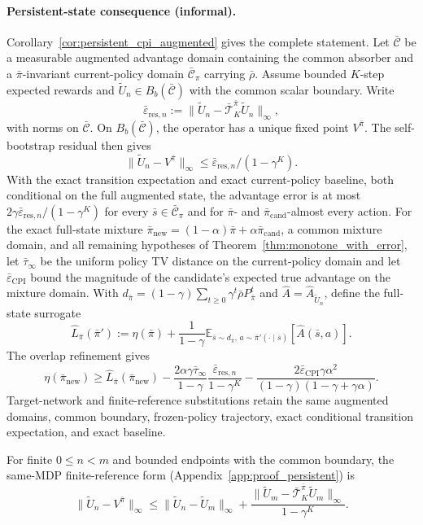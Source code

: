 \documentclass{article}
\theoremstyle{plain}
\theoremstyle{definition}
\theoremstyle{remark}
\newcommand{\E}{\mathbb{E}}
\begin{document}
\paragraph{Persistent-state consequence (informal).}
Corollary~\ref{cor:persistent_cpi_augmented} gives the complete statement. Let
$\bar{\mathcal C}$ be a measurable augmented advantage domain containing the
common absorber and a $\bar\pi$-invariant current-policy domain
$\bar{\mathcal C}_\pi$ carrying $\bar\rho$. Assume bounded $K$-step expected rewards and
$\widetilde U_n\in B_b(\bar{\mathcal C})$ with the common scalar boundary.
Write
\[
\bar\varepsilon_{\mathrm{res},n}:=
\|\widetilde U_n-\bar{\mathcal T}^{\bar\pi}_K\widetilde U_n\|_\infty,
\]
with norms on $\bar{\mathcal C}$. On $B_b(\bar{\mathcal C})$, the operator has
a unique fixed point $V^{\bar\pi}$. The self-bootstrap residual then gives
\[
\|\widetilde U_n-V^{\bar\pi}\|_\infty
\le \bar\varepsilon_{\mathrm{res},n}/(1-\gamma^K).
\]
With the exact transition expectation and exact current-policy baseline, both
conditional on the full augmented state, the advantage error is at most
$2\gamma\bar\varepsilon_{\mathrm{res},n}/(1-\gamma^K)$ for every
$\bar s\in\bar{\mathcal C}_\pi$ and for $\bar\pi$- and
$\bar\pi_{\mathrm{cand}}$-almost every action.
For the exact full-state mixture
$\bar\pi_{\mathrm{new}}=(1-\alpha)\bar\pi+
\alpha\bar\pi_{\mathrm{cand}}$, a common mixture domain, and all remaining
hypotheses of Theorem~\ref{thm:monotone_with_error}, let
$\bar\tau_\infty$ be the uniform policy TV distance on the current-policy
domain and let $\bar\varepsilon_{\mathrm{CPI}}$ bound the magnitude of the candidate's
expected true advantage on the mixture domain. With
$d_{\bar\pi}=(1-\gamma)\sum_{t\ge0}\gamma^t\bar\rho P_{\bar\pi}^t$ and
$\widehat A=\widehat A_{\widetilde U_n}$, define the full-state surrogate
\[
\widehat L_{\bar\pi}(\bar\pi')
:=\eta(\bar\pi)+\frac{1}{1-\gamma}
\E_{\bar s\sim d_{\bar\pi},\,a\sim\bar\pi'(\cdot\mid\bar s)}
[\widehat A(\bar s,a)].
\]
The overlap refinement gives
\[
\eta(\bar\pi_{\mathrm{new}})
\ge \widehat L_{\bar\pi}(\bar\pi_{\mathrm{new}})
-\frac{2\alpha\gamma\bar\tau_\infty}{1-\gamma}
\frac{\bar\varepsilon_{\mathrm{res},n}}{1-\gamma^K}
-\frac{2\bar\varepsilon_{\mathrm{CPI}}\gamma\alpha^2}
{(1-\gamma)(1-\gamma+\gamma\alpha)}.
\]
Target-network and finite-reference substitutions retain the same augmented
domains, common boundary, frozen-policy trajectory, exact conditional
transition expectation, and exact baseline.

For finite $0\le n<m$ and bounded endpoints with the common boundary, the
same-MDP finite-reference form (Appendix~\ref{app:proof_persistent}) is
\begin{equation}
\|\widetilde U_n-V^{\bar\pi}\|_\infty
\le
\|\widetilde U_n-\widetilde U_m\|_\infty
+\frac{\|\widetilde U_m-
\bar{\mathcal T}^{\bar\pi}_K\widetilde U_m\|_\infty}{1-\gamma^K}.
\label{eq:persistent_finite_reference_main}
\end{equation}
\end{document}
